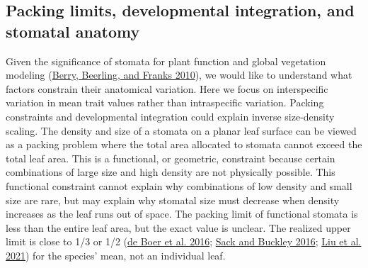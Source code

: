 \documentclass[
  12pt,
]{article}
\begin{document}
\hypertarget{packing-limits-developmental-integration-and-stomatal-anatomy}{%
\subsection{Packing limits, developmental integration, and stomatal anatomy}\label{packing-limits-developmental-integration-and-stomatal-anatomy}}

Given the significance of stomata for plant function and global vegetation modeling (\protect\hyperlink{ref-berry_stomata:_2010}{Berry, Beerling, and Franks 2010}), we would like to understand what factors constrain their anatomical variation. Here we focus on interspecific variation in mean trait values rather than intraspecific variation. Packing constraints and developmental integration could explain inverse size-density scaling. The density and size of a stomata on a planar leaf surface can be viewed as a packing problem where the total area allocated to stomata cannot exceed the total leaf area. This is a functional, or geometric, constraint because certain combinations of large size and high density are not physically possible. This functional constraint cannot explain why combinations of low density and small size are rare, but may explain why stomatal size must decrease when density increases as the leaf runs out of space. The packing limit of functional stomata is less than the entire leaf area, but the exact value is unclear. The realized upper limit is close to 1/3 or 1/2 (\protect\hyperlink{ref-de_boer_optimal_2016}{de Boer et al. 2016}; \protect\hyperlink{ref-sack_developmental_2016}{Sack and Buckley 2016}; \protect\hyperlink{ref-liu_scaling_2021}{Liu et al. 2021}) for the species' mean, not an individual leaf.
\end{document}
